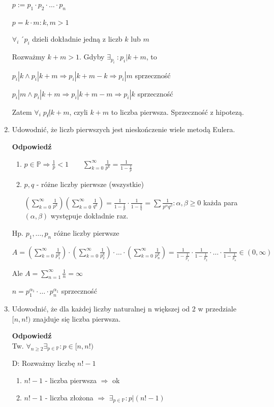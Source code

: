 \documentclass[12pt,a4paper]{article}
\theoremstyle{break}
\newcommand{\Odp}[1]{
		\begin{mdframed}[style=zadanie]
			\textbf{Odpowiedź}\\
			#1
		\end{mdframed}
	}
\begin{document}
\begin{enumerate}[1.]
{		$p:=p_1\cdot p_2\cdot\dots\cdot p_n$
		
		$p=k\cdot m: k,m>1$
		
		$\forall_i\:´ p_i$ dzieli dokładnie jedną z liczb $k$ lub $m$
		
		Rozważmy $k+m>1$. Gdyby $\exists_{p_i}\:: p_i|k+m$, to
		
		$p_i|k \wedge p_i|k+m \Rightarrow p_i|k+m-k \Rightarrow p_i|m$ sprzeczność
		
		$p_i|m \wedge p_i|k+m \Rightarrow p_i|k+m-m \Rightarrow p_i|k$ sprzeczność
		
		Zatem $\forall_i \; p_i\not|k+m$, czyli $k+m$ to liczba pierwsza. Sprzeczność z hipotezą.
	}
	
	\item Udowodnić, że liczb pierwszych jest nieskończenie wiele metodą Eulera.
	\Odp{
		\begin{enumerate}[1)]
			\item $p\in\mathbb{P} \Rightarrow \frac{1}{p} < 1 \qquad \sum_{k=0}^{\infty}\frac{1}{p^k}=\frac{1}{1-\frac{1}{p}}$
			\item $p,q$ - różne liczby pierwsze (wszystkie)
			
			$(\sum_{k=0}^{\infty}\frac{1}{p^k})(\sum_{k=0}^{\infty}\frac{1}{q^k}) = \frac{1}{1-\frac{1}{p}}\cdot\frac{1}{1-\frac{1}{q}}=\sum \frac{1}{p^\alpha q^\beta} : \alpha,\beta\geq 0$ każda para $(\alpha,\beta)$ występuje dokładnie raz.
		\end{enumerate}
		
		Hp. $p_1,\dots,p_n$ różne liczby pierwsze
		
		$A=(\sum_{k=0}^{\infty}\frac{1}{p_1^k})\cdot(\sum_{k=0}^{\infty}\frac{1}{p_2^k})\cdot\dots\cdot(\sum_{k=0}^{\infty}\frac{1}{p_n^k})=\frac{1}{1-\frac{1}{p_1}}\cdot\frac{1}{1-\frac{1}{p_2}}\cdot\dots\cdot\frac{1}{1-\frac{1}{p_n}}\in(0,\infty)$
		
		Ale $A=\sum_{n=1}^{\infty}\frac{1}{n}=\infty$
		
		$n=p_1^{\alpha_1}\cdot \dots \cdot p_n^{\alpha_1}$ sprzeczność
	}
	\newpage
	\item Udowodnić, że dla każdej liczby naturalnej n większej od 2 w przedziale $[n, n!)$ znajduje
	się liczba pierwsza.
	\Odp{
		Tw. $\forall_{n\geq 2} \exists_{p\in\mathbb{P}} : p\in [n,n!)$
		
		D: Rozważmy liczbę $n!-1$
		\begin{enumerate}[$1^\circ$]
			\item $n!-1$ - liczba pierwsza $\Rightarrow$ ok
			\item $n!-1$ - liczba złożona $\Rightarrow$ $\exists_{p\in\mathbb{P}} : p|(n!-1) $
			

\end{enumerate}}
\end{enumerate}
\end{document}
